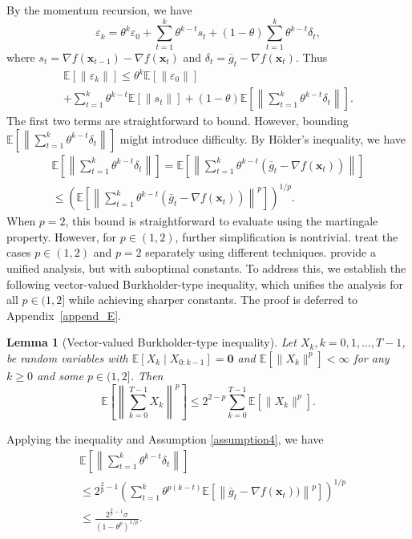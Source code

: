 \documentclass{article}
\newcommand{\bx}{\boldsymbol{x}}
\newcommand{\barg}{\bar{g}}
\theoremstyle{plain}
\newtheorem{lemma}[theorem]{Lemma}
\theoremstyle{definition}
\theoremstyle{remark}
\begin{document}
By the momentum recursion, we have
\begin{equation*}
   \varepsilon_k =  \theta^k \varepsilon_0 + \sum_{t=1}^k\theta^{k-t} s_t + (1-\theta) \sum_{t=1}^k\theta^{k-t} \delta_t,
\end{equation*}
where $s_t = \nabla f(\bx_{t-1}) - \nabla f(\bx_{t})$ and $\delta_t = \barg_t - \nabla f(\bx_t)$. Thus
\begin{multline*}
   \mathbb{E}[\| \varepsilon_k\| ] \leq   \theta^k \mathbb{E}[ \| \varepsilon_0\| ] \\
   + \sum_{t=1}^k\theta^{k-t}\mathbb{E}[ \| s_t\|] + (1-\theta) \mathbb{E}\left[ \left\|\sum_{t=1}^k\theta^{k-t} \delta_t\right\|\right].
\end{multline*}
The first two terms are straightforward to bound. However, bounding $\mathbb{E}\left[\left\|\sum_{t=1}^k\theta^{k-t} \delta_t\right\|\right]$ might introduce difficulty.
By Hölder's inequality, we have
\begin{multline*}
    \mathbb{E}\left[\left\|\sum_{t=1}^k\theta^{k-t} \delta_t\right\|\right]  = \mathbb{E}\left[\left\|\sum_{t=1}^k\theta^{k-t} (\barg_t-\nabla f(\bx_t))\right\|\right] \\
     \leq \left(\mathbb{E}\left[\left\|\sum_{t=1}^k\theta^{k-t} \left(\barg_t-\nabla f(\bx_t)\right)\right\|^p\right] \right)^{1/p}.
\end{multline*}
When $p=2$, this bound is straightforward to evaluate using the martingale property. However, for $p\in(1,2)$, further simplification is nontrivial. \citet{Liu2025Nonconvex} treat the cases $p\in(1,2)$ and $p=2$ separately using different techniques. \citet{Hubler2024Gradient} provide a unified analysis, but with suboptimal constants. To address this, we establish the following vector-valued Burkholder-type inequality, which unifies the analysis for all $p\in (1,2]$ while achieving sharper constants. The proof is deferred to Appendix~\ref{append_E}.
\begin{lemma}[Vector-valued Burkholder-type inequality]\label{Burkholder}
Let $X_k, k=0,1,\dots,T-1$, be random variables with $\mathbb{E}[X_k\mid X_{0:k-1}]=\boldsymbol{0}$ and $\mathbb{E}[\|X_k\|^{p}]<\infty$ for any $k\geq 0$ and some $p \in (1,2]$. Then 
\begin{equation*}
\mathbb{E}\left[ \left\| \sum_{k=0}^{T-1} X_k \right\| ^{p} \right] \leq 2^{2-p} \sum_{k=0}^{T-1} \mathbb{E}[\|X_k\|^{p}].
\end{equation*}
\end{lemma}	

Applying the inequality and Assumption \ref{assumption4}, we have
\begin{align*}
    & \mathbb{E}\left[\left\|\sum_{t=1}^k\theta^{k-t} \delta_t\right\|\right]\\
    & \leq 2^{\frac{2}{p}-1}\left(\sum_{t=1}^k\theta^{p(k-t)}\mathbb{E}\left[\left\|\barg_t - \nabla f(\bx_t))\right\|^p\right] \right)^{1/p} \\
    & \leq \frac{2^{\frac{2}{p}-1} \sigma}{(1-\theta^p)^{1/p}}.
\end{align*}
\end{document}
